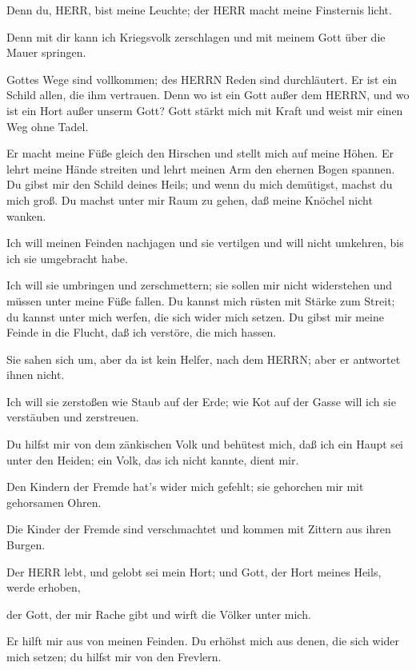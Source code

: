  Denn du, HERR, bist meine Leuchte; der HERR macht meine
Finsternis licht.

 Denn mit dir kann ich Kriegsvolk zerschlagen und mit
meinem Gott über die Mauer springen.

 Gottes Wege sind vollkommen; des HERRN Reden sind
durchläutert. Er ist ein Schild allen, die ihm vertrauen. 
Denn wo ist ein Gott außer dem HERRN, und wo ist ein Hort außer unserm
Gott?  Gott stärkt mich mit Kraft und weist mir einen Weg
ohne Tadel.

 Er macht meine Füße gleich den Hirschen und stellt mich
auf meine Höhen.  Er lehrt meine Hände streiten und lehrt
meinen Arm den ehernen Bogen spannen.  Du gibst mir den
Schild deines Heils; und wenn du mich demütigst, machst du mich groß.
 Du machst unter mir Raum zu gehen, daß meine Knöchel nicht
wanken.

 Ich will meinen Feinden nachjagen und sie vertilgen und
will nicht umkehren, bis ich sie umgebracht habe.

 Ich will sie umbringen und zerschmettern; sie sollen mir
nicht widerstehen und müssen unter meine Füße fallen.  Du
kannst mich rüsten mit Stärke zum Streit; du kannst unter mich werfen,
die sich wider mich setzen.  Du gibst mir meine Feinde in
die Flucht, daß ich verstöre, die mich hassen.

 Sie sahen sich um, aber da ist kein Helfer, nach dem
HERRN; aber er antwortet ihnen nicht.

 Ich will sie zerstoßen wie Staub auf der Erde; wie Kot auf
der Gasse will ich sie verstäuben und zerstreuen.

 Du hilfst mir von dem zänkischen Volk und behütest mich,
daß ich ein Haupt sei unter den Heiden; ein Volk, das ich nicht kannte,
dient mir.

 Den Kindern der Fremde hat's wider mich gefehlt; sie
gehorchen mir mit gehorsamen Ohren.

 Die Kinder der Fremde sind verschmachtet und kommen mit
Zittern aus ihren Burgen.

 Der HERR lebt, und gelobt sei mein Hort; und Gott, der
Hort meines Heils, werde erhoben,

 der Gott, der mir Rache gibt und wirft die Völker unter
mich.

 Er hilft mir aus von meinen Feinden. Du erhöhst mich aus
denen, die sich wider mich setzen; du hilfst mir von den Frevlern.

